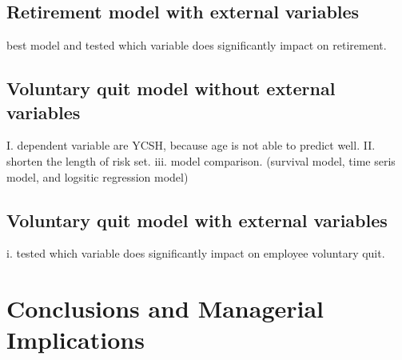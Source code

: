 \documentclass[12pt,letterpaper]{article}
\begin{document}
\subsection{Retirement model with external variables}
     best model and tested which variable does significantly impact on retirement.
\subsection{Voluntary quit model without external variables}
     I. dependent variable are YCSH, because age is not able to predict well.
     II. shorten the length of risk set.
     iii. model comparison. (survival model, time seris model, and logsitic regression model)
\subsection{Voluntary quit model with external variables}
    i. tested which variable does significantly impact on employee voluntary quit.


\section{Conclusions and Managerial Implications} 


	
\end{document}

